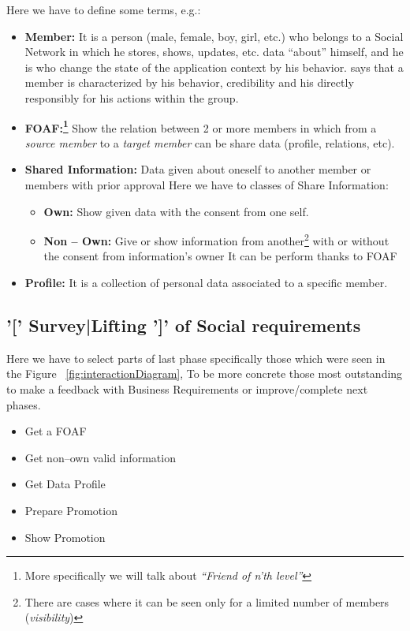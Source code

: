 \documentclass[a4paper]{memoir}
\begin{document}
		Here we have to define some terms, e.g.:
		\begin{itemize}
			\item \textbf{Member:} It is a person (male, female, boy, girl, etc.) who belongs to a Social Network in which he stores, shows, updates, etc. data ``about'' himself, and he is who change the state of the application context by his behavior. \cite{Frattini2007} says that a member is characterized by his behavior, credibility and his directly responsibly for his actions within the group.
			\item \textbf{\ac{FOAF}:\footnote{More specifically we will talk about \textit{``Friend of n'th level''}}} Show the relation between 2 or more members in which from a \textit{source member} to a \textit{target member} can be share data (profile, relations, etc).
			\item \textbf{Shared Information:} Data given about oneself to another member or members with prior approval  Here we have to classes of Share Information:
			\begin{itemize}
				\item \textbf{Own:} Show given data with the consent from one self.
				\item \textbf{Non -- Own:} Give or show information from another\footnote{There are cases where it can be seen only for a limited number of members (\textit{visibility})} with or without the consent from information's owner  It can be perform thanks to \ac{FOAF}
			\end{itemize}
			\item \textbf{Profile:} It is a collection of personal data associated to a specific member.
		\end{itemize}
	\subsection{'[' Survey|Lifting ']' of Social requirements}
		Here we have to select parts of last phase specifically those which were seen in the Figure ~\ref{fig:interactionDiagram}, To be more concrete those most outstanding to make a feedback with Business Requirements or improve/complete next phases.
		
		\begin{itemize}
			\item Get a \ac{FOAF}
			\item Get non--own valid information
			\item Get Data Profile
			\item Prepare Promotion
			\item Show Promotion
		\end{itemize}
\end{document}
